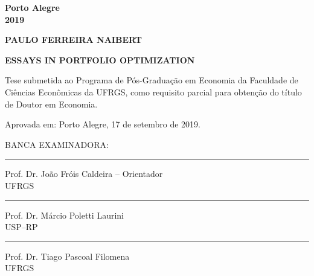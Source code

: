\documentclass[12pt,oneside,a4paper]{memoir}
\begin{document}
\begin{center}
\textbf{Porto Alegre
\\
2019}
\end{center}

\clearpage
% 

\clearpage

\begin{center}
\textbf{PAULO FERREIRA NAIBERT}
\end{center}

\vspace{3 em}

\begin{center}
\textbf{ESSAYS IN PORTFOLIO OPTIMIZATION}
\end{center}

\vspace{3 em}
\hfill  
\begin{minipage}{.5\textwidth}
\begin{SingleSpace}
Tese submetida ao Programa de Pós-Graduação em Economia da Faculdade de Ciências Econômicas da UFRGS, como requisito parcial para obtenção do título de Doutor em Economia.
\end{SingleSpace}
\end{minipage}
\vfill

\noindent
Aprovada em: Porto Alegre, 17 de setembro de 2019.\\
\vspace{1 em}

\noindent
BANCA EXAMINADORA:\\
%

\vspace{1 em}
\noindent
\rule{\textwidth}{1pt}
Prof. Dr. João Fróis Caldeira -- Orientador\\
UFRGS\\

\vspace{1 em}
\noindent
\rule{\textwidth}{1pt}
Prof. Dr. Márcio Poletti Laurini\\
USP--RP\\

\vspace{1 em}
\noindent
\rule{\textwidth}{1pt}
Prof. Dr. Tiago Pascoal Filomena\\
UFRGS\\
\end{document}
